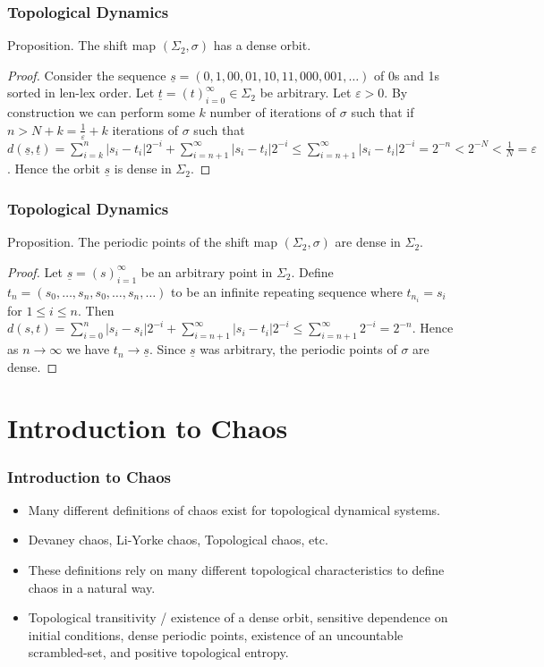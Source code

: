 \documentclass{beamer}
\begin{document}
\begin{frame}
    \frametitle{Topological Dynamics}
    \begin{block}{Proposition.}
        The shift map $(\Sigma_2, \sigma)$ has a dense orbit. \cite{devaney}
    \begin{proof}
        Consider the sequence $\underline{s} = (0, 1, 00, 01, 10, 11, 000, 001, \dots)$ of 0s and 1s sorted in len-lex order. Let $\underline{t} = (t)_{i=0}^{\infty} \in \Sigma_2$ be arbitrary. Let $\varepsilon > 0$. By construction we can perform some $k$ number of iterations of $\sigma$ such that if $n > N + k = \frac{1}{\varepsilon} + k$ iterations of $\sigma$ such that $d(\underline{s}, \underline{t}) = \sum_{i = k}^{n}|s_i - t_i|2^{-i} + \sum_{i = n+1}^{\infty}|s_i - t_i|2^{-i} \leq \sum_{i = n+1}^{\infty}|s_i - t_i|2^{-i} = 2^{-n} < 2^{-N} < \frac{1}{N} = \varepsilon$. Hence the orbit $\underline{s}$ is dense in $\Sigma_2$.
    \end{proof}
    \end{block}
\end{frame}

\begin{frame}
    \frametitle{Topological Dynamics}
    \begin{block}{Proposition.}
        The periodic points of the shift map $(\Sigma_2, \sigma)$ are dense in $\Sigma_2$. \cite{devaney}
    \begin{proof}
        Let $\underline{s} = (s)_{i=1}^{\infty}$ be an arbitrary point in $\Sigma_2$. Define $t_n = (s_0, \dots, s_n, s_0, \dots, s_n, \dots)$ to be an infinite repeating sequence where $t_{n_i} = s_i$ for $1 \leq i \leq n$. Then $d(s, t) = \sum_{i = 0}^n|s_i - s_i|2^{-i} + \sum_{i=n+1}^{\infty}|s_i - t_i|2^{-i} \leq \sum_{i = n+1}^{\infty}2^{-i} = 2^{-n}$. Hence as $n \to \infty$ we have $t_n \to \underline{s}$. Since $\underline{s}$ was arbitrary, the periodic points of $\sigma$ are dense.
    \end{proof}
    \end{block}
\end{frame}

\section{Introduction to Chaos}

\begin{frame}
    \frametitle{Introduction to Chaos}
    \begin{itemize}
        \item Many different definitions of chaos exist for topological dynamical systems.
        \item Devaney chaos, Li-Yorke chaos, Topological chaos, etc.
        \item These definitions rely on many different topological characteristics to define chaos in a natural way.
        \item Topological transitivity / existence of a dense orbit, sensitive dependence on initial conditions, dense periodic points, existence of an uncountable scrambled-set, and positive topological entropy.
    \end{itemize}
\end{frame}
\end{document}
